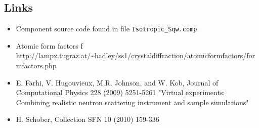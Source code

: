 \subsection*{Links}
\begin{itemize}
  \item Component source code found in file \texttt{Isotropic\_Sqw.comp}.
  \item Atomic form factors f http://lampx.tugraz.at/\textasciitilde{}hadley/ss1/crystaldiffraction/atomicformfactors/formfactors.php
  \item E. Farhi, V. Hugouvieux, M.R. Johnson, and W. Kob, Journal of Computational Physics 228 (2009) 5251-5261 "Virtual experiments: Combining realistic neutron scattering instrument and sample simulations"
  \item H. Schober, Collection SFN 10 (2010) 159-336
\end{itemize}
